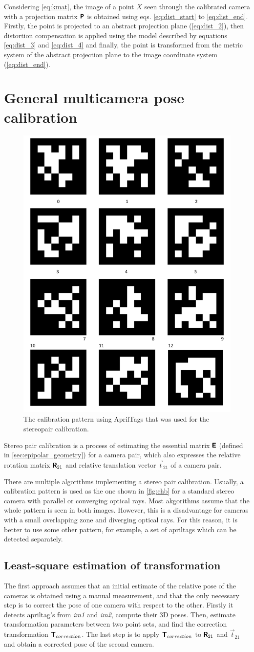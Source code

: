 Considering \autoref{eq:kmat}, the image of a point $X$ seen through the calibrated camera with a projection matrix $\pmb{\mathsf{P}}$ is obtained using eqs. \eqref{eq:dist_start} to \eqref{eq:dist_end}. 
Firstly, the point is projected to an abstract projection plane (\autoref{eq:dist_2}), then distortion compensation is applied using the model described by equations \eqref{eq:dist_3} and \eqref{eq:dist_4} and finally, the point is transformed from the metric system of the abstract projection plane to the image coordinate system (\autoref{eq:dist_end}).

\section{General multicamera pose calibration}
\label{sec:stereocalib}

\begin{figure}[h]
    \centering
    \includegraphics[width=.2\textwidth]{graphics/aptags.png}
    \caption{The calibration pattern using AprilTags \cite{Wang2016} that was used for the stereopair calibration.}
    \label{fig:aptags}
\end{figure}

Stereo pair calibration is a process of estimating the essential matrix $\pmb{\mathsf{E}}$ (defined in \autoref{sec:epipolar_geometry}) for a camera pair, which also expresses the relative rotation matrix $\pmb{\mathsf{R}}_{21}$ and relative translation vector $\vec{t}_{21}$ of a camera pair. 

There are multiple algorithms implementing a stereo pair calibration.
Usually, a calibration pattern is used as the one shown in \autoref{fig:chb} for a standard stereo camera with parallel or converging optical rays.
Most akgorithms assume that the whole pattern is seen in both images.
However, this is a disadvantage for cameras with a small overlapping zone and diverging optical rays.
For this reason, it is better to use some other pattern, for example, a set of apriltags \cite{Malyuta2019} which can be detected separately. 

\subsection{Least-square estimation of transformation}
\label{sec:lsq_umeyama}
The first approach assumes that an initial estimate of the relative pose of the cameras is obtained using a manual measurement, and that the only necessary step is to correct the pose of one camera with respect to the other.
Firstly it detects apriltag's from \textit{im1} and \textit{im2}, compute their 3D poses.
Then, estimate transformation parameters between two point sets, and find the correction transformation $\pmb{\mathsf{T}}_{correction}$.
The last step is to apply $\pmb{\mathsf{T}}_{correction}$ to $\pmb{\mathsf{R}}_{21}$ and $\vec{t}_{21}$ and obtain a corrected pose of the second camera.


